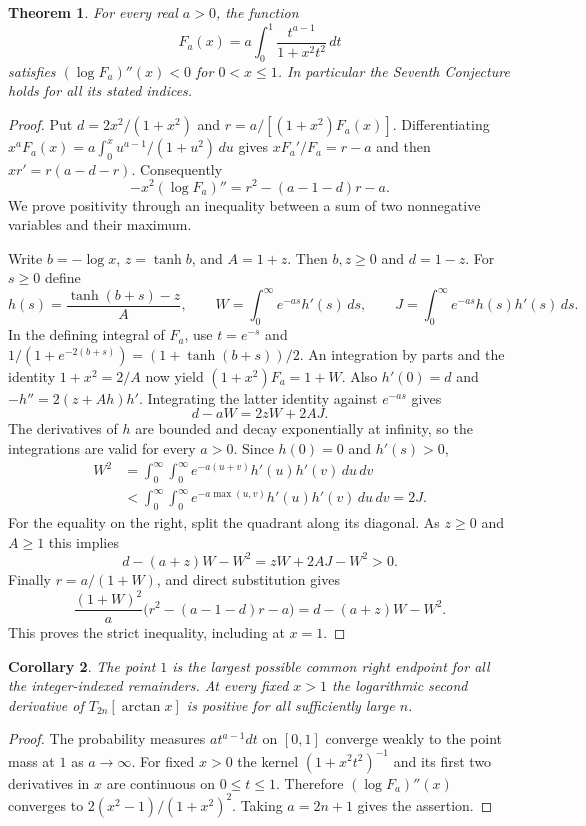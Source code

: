 \documentclass[11pt,a4paper]{article}
\newtheorem{theorem}{Theorem}[section]
\newtheorem{corollary}[theorem]{Corollary}
\numberwithin{equation}{section}
\begin{document}
\begin{theorem}\label{thm:qi-seventh}
For every real $a>0$, the function
\[
 F_a(x)=a\int_0^1\frac{t^{a-1}}{1+x^2t^2}\,dt
\]
satisfies $(\log F_a)''(x)<0$ for $0<x\le1$.
In particular the Seventh Conjecture holds for all its stated indices.
\end{theorem}
\begin{proof}
Put $d=2x^2/(1+x^2)$ and $r=a/[(1+x^2)F_a(x)]$.
Differentiating $x^a F_a(x)=a\int_0^x u^{a-1}/(1+u^2)\,du$
gives $xF_a'/F_a=r-a$ and then $xr'=r(a-d-r)$.
Consequently
\[
 -x^2(\log F_a)''=r^2-(a-1-d)r-a .
\]
We prove positivity through an inequality between a sum of two
nonnegative variables and their maximum.

Write $b=-\log x$, $z=\tanh b$, and $A=1+z$. Then $b,z\ge0$ and
$d=1-z$. For $s\ge0$ define
\[
 h(s)=\frac{\tanh(b+s)-z}{A},\qquad
 W=\int_0^\infty e^{-as}h'(s)\,ds,\qquad
 J=\int_0^\infty e^{-as}h(s)h'(s)\,ds .
\]
In the defining integral of $F_a$, use $t=e^{-s}$ and
$1/(1+e^{-2(b+s)})=(1+\tanh(b+s))/2$.
An integration by parts and the identity $1+x^2=2/A$ now yield
$(1+x^2)F_a=1+W$. Also $h'(0)=d$ and
$-h''=2(z+Ah)h'$. Integrating the latter identity against
$e^{-as}$ gives
\[
 d-aW=2zW+2AJ .
\]
The derivatives of $h$ are bounded and decay exponentially at
infinity, so the integrations are valid for every $a>0$.
Since $h(0)=0$ and $h'(s)>0$,
\begin{align*}
 W^2
 &=\int_0^\infty\!\int_0^\infty
    e^{-a(u+v)}h'(u)h'(v)\,du\,dv\\
 &<\int_0^\infty\!\int_0^\infty
    e^{-a\max(u,v)}h'(u)h'(v)\,du\,dv
 =2J .
\end{align*}
For the equality on the right, split the quadrant along its diagonal.
As $z\ge0$ and $A\ge1$ this implies
\[
 d-(a+z)W-W^2=zW+2AJ-W^2>0 .
\]
Finally $r=a/(1+W)$, and direct substitution gives
\[
 \frac{(1+W)^2}{a}\bigl(r^2-(a-1-d)r-a\bigr)
   =d-(a+z)W-W^2 .
\]
This proves the strict inequality, including at $x=1$.
\end{proof}

\begin{corollary}
The point $1$ is the largest possible common right endpoint for all
the integer-indexed remainders. At every fixed $x>1$ the logarithmic
second derivative of $T_{2n}[\arctan x]$ is positive for all sufficiently
large $n$.
\end{corollary}
\begin{proof}
The probability measures $a t^{a-1}dt$ on $[0,1]$ converge weakly to
the point mass at $1$ as $a\to\infty$. For fixed $x>0$ the kernel
$(1+x^2t^2)^{-1}$ and its first two derivatives in $x$ are continuous
on $0\le t\le1$. Therefore $(\log F_a)''(x)$ converges to
$2(x^2-1)/(1+x^2)^2$. Taking $a=2n+1$ gives the assertion.
\end{proof}
\end{document}
